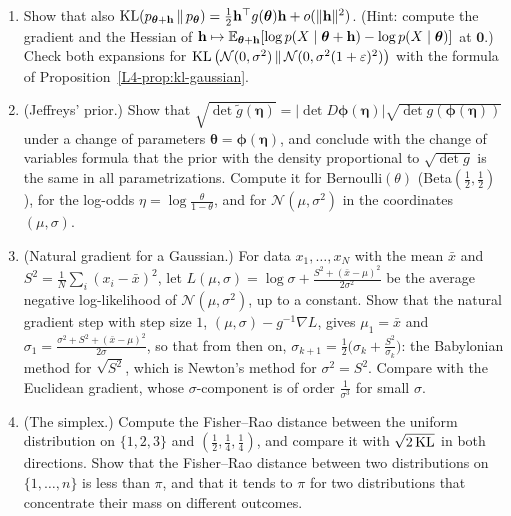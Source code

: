 \begin{enumerate}[leftmargin=*]
    \item\label{A-exer:kl-reverse} Show that also $\operatorname{KL}(p_{\boldsymbol{\theta} + \mathbf{h}} \,\|\, p_{\boldsymbol{\theta}}) = \frac{1}{2}\mathbf{h}^\top g(\boldsymbol{\theta})\mathbf{h} + o(\lVert \mathbf{h} \rVert^2)$. (Hint: compute the gradient and the Hessian of $\mathbf{h} \mapsto \mathbb{E}_{\boldsymbol{\theta} + \mathbf{h}}[\log p(X \mid \boldsymbol{\theta} + \mathbf{h}) - \log p(X \mid \boldsymbol{\theta})]$ at $\mathbf{0}$.) Check both expansions for $\operatorname{KL}\big(\mathcal{N}(0, \sigma^2) \,\|\, \mathcal{N}(0, \sigma^2(1 + \varepsilon)^2)\big)$ with the formula of Proposition~\ref{L4-prop:kl-gaussian}.
    \item\label{A-exer:jeffreys} (Jeffreys' prior.) Show that $\sqrt{\det\tilde g(\boldsymbol{\eta})} = |\det D\boldsymbol{\phi}(\boldsymbol{\eta})|\sqrt{\det g(\boldsymbol{\phi}(\boldsymbol{\eta}))}$ under a change of parameters $\boldsymbol{\theta} = \boldsymbol{\phi}(\boldsymbol{\eta})$, and conclude with the change of variables formula that the prior with the density proportional to $\sqrt{\det g}$ is the same in all parametrizations. Compute it for Bernoulli$(\theta)$ (Beta$(\frac{1}{2}, \frac{1}{2})$), for the log-odds $\eta = \log\frac{\theta}{1 - \theta}$, and for $\mathcal{N}(\mu, \sigma^2)$ in the coordinates $(\mu, \sigma)$.
    \item\label{A-exer:natural-gaussian} (Natural gradient for a Gaussian.) For data $x_1, \ldots, x_N$ with the mean $\bar x$ and $S^2 = \frac{1}{N}\sum_i (x_i - \bar x)^2$, let $L(\mu, \sigma) = \log\sigma + \frac{S^2 + (\bar x - \mu)^2}{2\sigma^2}$ be the average negative log-likelihood of $\mathcal{N}(\mu, \sigma^2)$, up to a constant. Show that the natural gradient step with step size $1$, $(\mu, \sigma) - g^{-1}\nabla L$, gives $\mu_1 = \bar x$ and $\sigma_1 = \frac{\sigma^2 + S^2 + (\bar x - \mu)^2}{2\sigma}$, so that from then on, $\sigma_{k+1} = \frac{1}{2}\big(\sigma_k + \frac{S^2}{\sigma_k}\big)$: the Babylonian method for $\sqrt{S^2}$, which is Newton's method for $\sigma^2 = S^2$. Compare with the Euclidean gradient, whose $\sigma$-component is of order $\frac{1}{\sigma^3}$ for small $\sigma$.
    \item (The simplex.) Compute the Fisher--Rao distance between the uniform distribution on $\{1, 2, 3\}$ and $(\frac{1}{2}, \frac{1}{4}, \frac{1}{4})$, and compare it with $\sqrt{2\operatorname{KL}}$ in both directions. Show that the Fisher--Rao distance between two distributions on $\{1, \ldots, n\}$ is less than $\pi$, and that it tends to $\pi$ for two distributions that concentrate their mass on different outcomes.
\end{enumerate}

